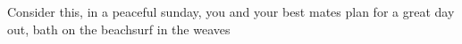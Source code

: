 Consider this, in a peaceful sunday, you and your best mates plan for a great day out, bath on the beachsurf in the weaves  